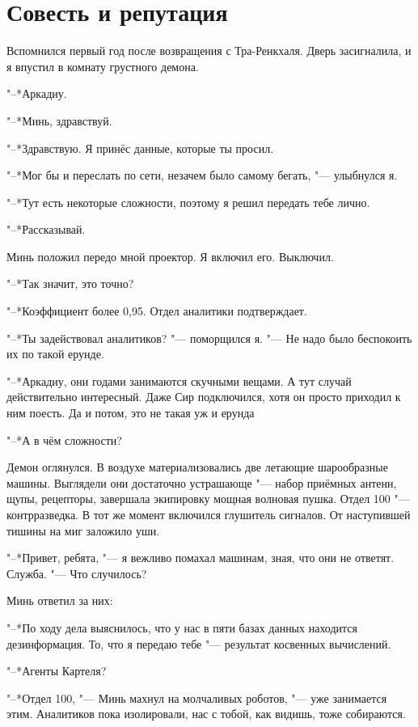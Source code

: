\documentclass[a4paper,10pt,fleqn]{book}
\newcommand{\ldotst}{\so{...}\xspace}
\begin{document}
\section{Совесть и репутация}

Вспомнился первый год после возвращения с Тра-Ренкхаля.
Дверь засигналила, и я впустил в комнату грустного демона.

"--*Аркадиу.

"--*Минь, здравствуй.

"--*Здравствую.
Я принёс данные, которые ты просил.

"--*Мог бы и переслать по сети, незачем было самому бегать, "--- улыбнулся я.

"--*Тут есть некоторые\ldotst сложности, поэтому я решил передать тебе лично.

"--*Рассказывай.

Минь положил передо мной проектор.
Я включил его.
Выключил.

"--*Так значит, это точно?

"--*Коэффициент более 0,95.
Отдел аналитики подтверждает.

"--*Ты задействовал аналитиков? "--- поморщился я.
"--- Не надо было беспокоить их по такой ерунде.

"--*Аркадиу, они годами занимаются скучными вещами.
А тут случай действительно интересный.
Даже Сир подключился, хотя он просто приходил к ним поесть.
Да и потом, это не такая уж и ерунда\ldotst

"--*А в чём сложности?

Демон оглянулся.
В воздухе материализовались две летающие шарообразные машины.
Выглядели они достаточно устрашающе "--- набор приёмных антенн, щупы, рецепторы, завершала экипировку мощная волновая пушка.
Отдел 100 "--- контрразведка.
В тот же момент включился глушитель сигналов.
От наступившей тишины на миг заложило уши.

"--*Привет, ребята, "--- я вежливо помахал машинам, зная, что они не ответят.
Служба.
"--- Что случилось?

Минь ответил за них:

"--*По ходу дела выяснилось, что у нас в пяти базах данных находится дезинформация.
То, что я передаю тебе "--- результат косвенных вычислений.

"--*Агенты Картеля?

"--*Отдел 100, "--- Минь махнул на молчаливых роботов, "--- уже занимается этим.
Аналитиков пока изолировали, нас с тобой, как видишь, тоже собираются.
\end{document}
